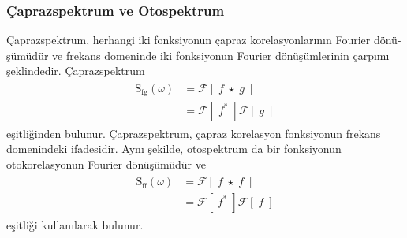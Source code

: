 \documentclass[turkish]{report}
\begin{document}
\subsubsection*{Çaprazspektrum ve Otospektrum}
Çaprazspektrum, herhangi iki fonksiyonun çapraz korelasyonlarının Fourier dönü-şümüdür ve frekans domeninde iki fonksiyonun Fourier dönüşümlerinin çarpımı şeklindedir. Çaprazspektrum 
\begin{eqnarray}
\begin{split}
\mathrm{S_{fg}}\left(\omega\right)&=\mathcal{F}\left[\;f\;\star\; g\;\right]\\&=\mathcal{F}\left[\;f^*\;\right] \mathcal{F}\left[\;g\;\right]
\end{split}
\end{eqnarray}
eşitliğinden bulunur. Çaprazspektrum, çapraz korelasyon fonksiyonun frekans domenindeki ifadesidir. Aynı şekilde, otospektrum da bir fonksiyonun otokorelasyonun Fourier dönüşümüdür ve
\begin{eqnarray}
\begin{split}
\mathrm{S_{ff}}\left(\omega\right)&=\mathcal{F}\left[\;f\;\star\; f\;\right]\\&=\mathcal{F}\left[\;f^*\;\right] \mathcal{F}\left[\;f\;\right]
\end{split}
\end{eqnarray}
eşitliği kullanılarak bulunur. \\
\end{document}
